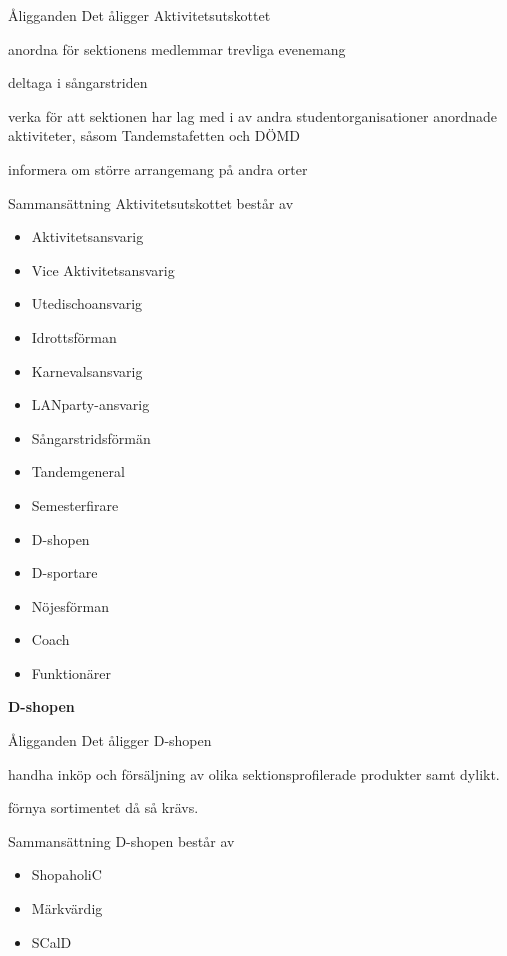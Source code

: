 \documentclass[pdfbookmarks,a4paper,11pt]{article}
\newlength{\itemcollength}
\newenvironment{reglemlista}{%
  \begin{list}{}{%
      \setlength{\labelwidth}{\itemcollength}%
      \setlength{\leftmargin}{\labelwidth + \labelsep}%
      \renewcommand{\makelabel}[1]{%
        \raisebox{0pt}[1ex][0pt]{%
          \makebox[\labelwidth][l]{%
            \parbox[t]{\itemcollength}{%
              \raggedright\hspace{0pt}##1}}}\hfill}%
      }}{%
  \end{list}}
\begin{document}
\begin{reglemlista}

	\item[Åligganden]
	Det åligger Aktivitetsutskottet
	\begin{attlista}
		\item anordna för sektionens medlemmar trevliga evenemang
		\item deltaga i sångarstriden
		\item verka för att sektionen har lag med i av andra studentorganisationer anordnade aktiviteter, såsom Tandemstafetten och DÖMD
		\item informera om större arrangemang på andra orter
	\end{attlista}

	\item[Sammansättning]
	Aktivitetsutskottet består av
	\begin{itemize}
		\item Aktivitetsansvarig
		\item Vice Aktivitetsansvarig
		\item Utedischoansvarig
		\item Idrottsförman
		\item Karnevalsansvarig
		\item LANparty-ansvarig
		\item Sångarstridsförmän
		\item Tandemgeneral
		\item Semesterfirare
		\item D-shopen
		\item D-sportare
		\item Nöjesförman
		\item Coach
		\item Funktionärer
	\end{itemize}


	\item[\textbf{D-shopen}]

	\item[Åligganden]
	Det åligger D-shopen
	\begin{attlista}
		\item handha inköp och försäljning av olika sektionsprofilerade produkter samt dylikt.
		\item förnya sortimentet då så krävs.
	\end{attlista}
	\item[Sammansättning]
	D-shopen består av
	\begin{itemize}
		\item ShopaholiC
		\item Märkvärdig
		\item SCalD
	\end{itemize}
\end{reglemlista}
\end{document}
